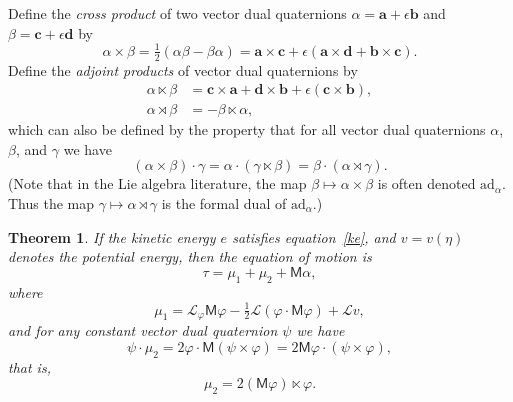 \documentclass[reqno,12pt]{amsart}
\newcommand{\liederiv}{\mathcal L}
\newtheorem{Theorem}{Theorem}
\begin{document}
Define the \emph{cross product} of two vector dual quaternions $\alpha = \bm a + \epsilon \bm b$ and $\beta = \bm c + \epsilon \bm d$ by
\begin{equation}
\alpha \times \beta = \tfrac12(\alpha \beta - \beta \alpha) = \bm a \times \bm c + \epsilon (\bm a \times \bm d + \bm b \times \bm c) .
\end{equation}
Define the \emph{adjoint products} of vector dual quaternions by
\begin{align}
\label{ltimes}
\alpha \ltimes \beta &= \bm c \times \bm a + \bm d \times \bm b + \epsilon (\bm c \times \bm b) ,\\
\alpha \rtimes \beta &= - \beta \ltimes \alpha ,
\end{align}
which can also be defined by the property that for all vector dual quaternions $\alpha$, $\beta$, and $\gamma$ we have
\begin{equation}
(\alpha \times \beta) \cdot \gamma = \alpha \cdot (\gamma \ltimes \beta) = \beta \cdot (\alpha \rtimes \gamma ).
\end{equation}
(Note that in the Lie algebra literature, the map $\beta \mapsto \alpha \times \beta$ is often denoted $\text{ad}_\alpha$.  Thus the map $\gamma \mapsto \alpha \rtimes \gamma$ is the formal dual of $\text{ad}_\alpha$.)


\begin{Theorem}
\label{euler-lagrange}
If the kinetic energy $e$ satisfies equation~\eqref{ke}, and $v = v(\eta)$ denotes the potential energy, then the equation of motion is
\begin{equation}
\label{tau M gamma}
\tau = \mu_1 + \mu_2 + \mathsf M \alpha,
\end{equation}
where
\begin{equation}
\mu_1 = \liederiv_\varphi \mathsf M \varphi - \tfrac12 \liederiv(\varphi \cdot \mathsf M \varphi) + \liederiv v, 
\end{equation}
and for any constant vector dual quaternion $\psi$ we have
\begin{equation}
\psi \cdot \mu_2 = 2 \varphi \cdot \mathsf M (\psi \times \varphi) = 2 \mathsf M \varphi \cdot (\psi \times \varphi),
\end{equation}
that is,
\begin{equation}
\label{formula mu_2}
\mu_2 = 2 (\mathsf M \varphi) \ltimes \varphi .
\end{equation}
\end{Theorem}
\end{document}
